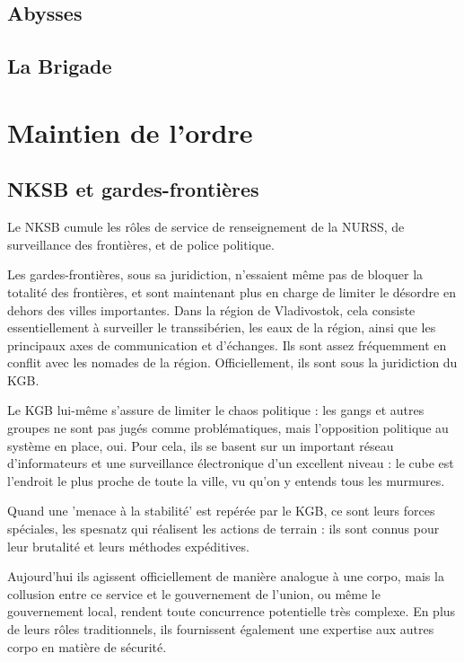 \documentclass[10pt,a4paper]{book}
\begin{document}
\subsection{Abysses}
\subsection{La Brigade}

\section{Maintien de l'ordre}
\subsection{NKSB et gardes-frontières}
Le NKSB cumule les rôles de service de renseignement de la NURSS, de surveillance des frontières, et de police politique.

Les gardes-frontières, sous sa juridiction, n'essaient même pas de bloquer la totalité des frontières, et sont maintenant plus en charge de limiter le désordre en dehors des villes importantes. Dans la région de Vladivostok, cela consiste essentiellement à surveiller le transsibérien, les eaux de la région, ainsi que les principaux axes de communication et d'échanges. Ils sont assez fréquemment en conflit avec les nomades de la région. Officiellement, ils sont sous la juridiction du KGB.

Le KGB lui-même s'assure de limiter le chaos politique : les gangs et autres groupes ne sont pas jugés comme problématiques, mais l'opposition politique au système en place, oui. Pour cela, ils se basent sur un important réseau d'informateurs et une surveillance électronique d'un excellent niveau : le cube est l'endroit le plus proche de toute la ville, vu qu'on y entends tous les murmures.

Quand une 'menace à la stabilité' est repérée par le KGB, ce sont leurs forces spéciales, les spesnatz qui réalisent les actions de terrain : ils sont connus pour leur brutalité et leurs méthodes expéditives. 

Aujourd'hui ils agissent officiellement de manière analogue à une corpo, mais la collusion entre ce service et le gouvernement de l'union, ou même le gouvernement local, rendent toute concurrence potentielle très complexe. En plus de leurs rôles traditionnels, ils fournissent également une expertise aux autres corpo en matière de sécurité.
\end{document}

